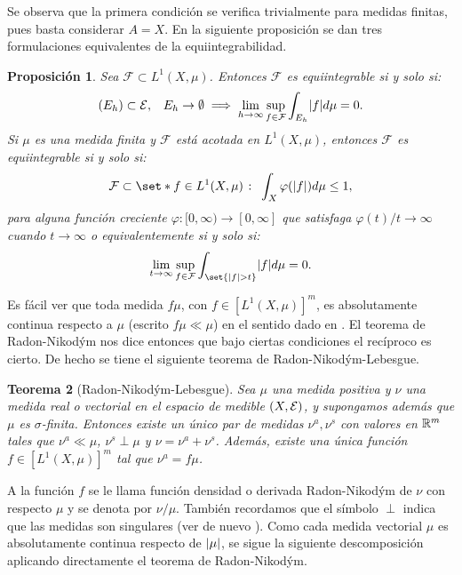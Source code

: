 \documentclass[a4paper,11pt,spanish, twoside, leqno]{tfm-uam}
\newtheorem{teo}{Teorema}[chapter]
\newtheorem{prop}[teo]{Proposición}
\begin{document}
Se observa que la primera condición se verifica trivialmente para medidas finitas, pues basta considerar  $A=X$. En la siguiente proposición se dan tres formulaciones equivalentes de la equiintegrabilidad.

\begin{prop}\label{teo:condiciones de equiitegrabilidad} 
Sea $\mathcal{F}\subset L^{1}(X,\mu)$. Entonces $\mathcal{F}$ es equiintegrable si y solo si:
\begin{align*}
\begin{array}{ll}
\displaystyle
(E_{h})\subset \mathcal{E}, &\displaystyle E_{h}\to \emptyset \implies \lim_{h\to \infty}\sup_{f\in \mathcal{F}}\int_{E_{h}}\lvert f\rvert d\mu =0.
\end{array}
\end{align*}
Si $\mu$ es una medida finita y $\mathcal{F}$ está acotada en $L^{1}(X,\mu)$, entonces $\mathcal{F}$ es equiintegrable si y solo si:
\begin{align*}
\mathcal{F}\subset \set*{f\in L^{1}(X,\mu)\given \int_{X}\varphi(\abs{f})d\mu\leq 1},
\end{align*}
para alguna función creciente $\varphi:[0,\infty)\to [0,\infty]$ que satisfaga $\varphi(t)/t\to\infty$ cuando $t\to \infty$ o equivalentemente si y solo si:
\begin{align*}
\lim_{t\to \infty}\sup_{f\in \mathcal{F}}\int_{\set{\abs{f}>t}}\abs{f}d\mu =0.
\end{align*}
\end{prop}

Es fácil ver que toda medida $f\mu$, con $f\in [L^{1}(X,\mu)]^{m}$, es absolutamente continua respecto a $\mu$ (escrito $f\mu \ll \mu$) en el sentido dado en \cite{folland2013real}. El teorema de Radon-Nikod\'ym nos dice entonces que bajo ciertas condiciones el recíproco es cierto. De hecho se tiene el siguiente teorema de Radon-Nikod\'ym-Lebesgue.
\begin{teo}[Radon-Nikod\'ym-Lebesgue] 
Sea $\mu$ una medida positiva y $\nu$ una medida real o vectorial en el espacio de medible $(X, \mathcal{E})$, y supongamos además que $\mu$ es $\sigma$-finita. Entonces existe un único par de medidas $\nu^{a}, \nu^{s}$ con valores en $\mathbb{R}^{m}$ tales que $\nu^{a}\ll\mu$, $\nu^{s}\perp \mu$ y $\nu=\nu^{a}+\nu^{s}$. Además, existe una única función $f\in [L^{1}(X, \mu)]^{m}$ tal que $\nu^{a}=f\mu$. 
\end{teo}
A la función $f$ se le llama función densidad o derivada Radon-Nikod\'ym de $\nu$ con respecto $\mu$ y se denota por $\nu/\mu$. También recordamos que el símbolo $\perp$ indica que las medidas son singulares (ver de nuevo \cite{folland2013real}). Como cada medida vectorial $\mu$ es absolutamente continua respecto de $\lvert\mu\rvert$, se sigue la siguiente descomposición aplicando directamente el teorema de Radon-Nikod\'ym.
\end{document}
